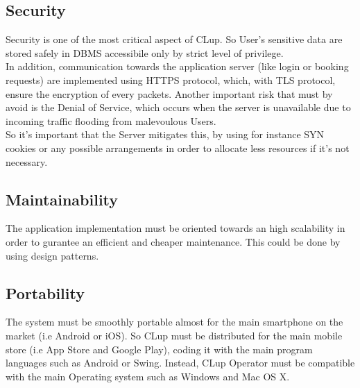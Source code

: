 \subsection{Security}
Security is one of the most critical aspect of CLup. So User's sensitive data are stored safely in DBMS accessibile only by strict level of privilege.\\ 
In addition, communication towards the application server (like login or booking requests) are implemented using  HTTPS protocol, which, with TLS protocol, ensure the encryption of every packets. Another important risk that must by avoid is the Denial of Service, which occurs when the server is unavailable due to incoming traffic flooding from malevoulous Users.\\
So it's important that the Server mitigates this, by using for instance SYN cookies or any possible arrangements in order to allocate less resources if it's not necessary.
\subsection{Maintainability}
The application implementation must be oriented towards an high scalability in order to gurantee an efficient and cheaper maintenance. This could be done by using design patterns.
\subsection{Portability}
The system must be smoothly portable almost for the main smartphone on the market (i.e Android or iOS). So CLup must be distributed for the main mobile store (i.e App Store and Google Play), coding it with the main program languages such as Android or Swing. Instead, CLup Operator
must be compatible with the main Operating system such as Windows and Mac OS X. 